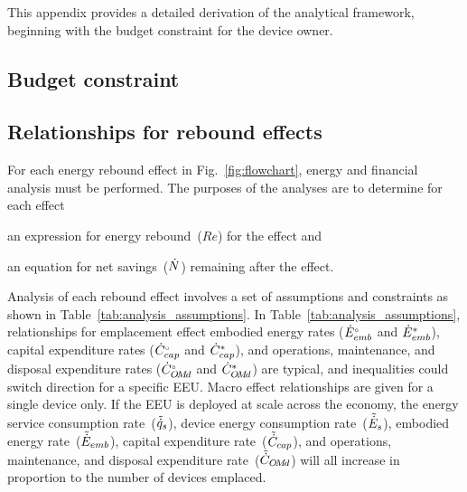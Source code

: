 

This appendix provides a detailed derivation of 
the analytical framework,
beginning with the budget constraint for the device owner.


\subsection{Budget constraint}
\label{sec:budget_constraint}







\subsection{Relationships for rebound effects}
\label{sec:relationships_for_stages}

For each energy rebound effect in Fig.~\ref{fig:flowchart},
energy and financial analysis must be performed.
The purposes of the analyses are to determine for each effect
%
\begin{enumerate*}[label={(\roman*)}]

  \item an expression for energy rebound~($Re$) for the effect and

  \item an equation for net savings~($\dot{N}$) remaining after the effect.

\end{enumerate*}

Analysis of each rebound effect
involves a set of assumptions and constraints
as shown in Table~\ref{tab:analysis_assumptions}.
In Table~\ref{tab:analysis_assumptions}, 
relationships for emplacement effect 
embodied energy rates (${}{\dot{E}}^{\scriptscriptstyle \circ}_{emb}$ and ${\dot{E}}^*_{emb}$), 
capital expenditure rates (${}{\dot{C}}^{\scriptscriptstyle \circ}_{cap}$ and ${\dot{C}}^*_{cap}$), and 
operations, maintenance, and disposal 
expenditure rates (${}{\dot{C}}^{\scriptscriptstyle \circ}_{O\!M\!d}$ and ${\dot{C}}^*_{O\!M\!d}$)
are typical, and
inequalities could switch direction for a specific EEU.
Macro effect relationships are given for a single device only.
If the EEU is deployed at scale across the economy, 
the energy service consumption rate~($\tilde{\dot{q}}_s$), 
device energy consumption rate~($\tilde{\dot{E}}_s$), 
embodied energy rate~($\tilde{\dot{E}}_{emb}$),
capital expenditure rate~($\tilde{\dot{C}}_{cap}$), and 
operations, maintenance, and disposal expenditure rate~($\tilde{\dot{C}}_{O\!M\!d}$)
will all increase in proportion to the number of devices emplaced.

